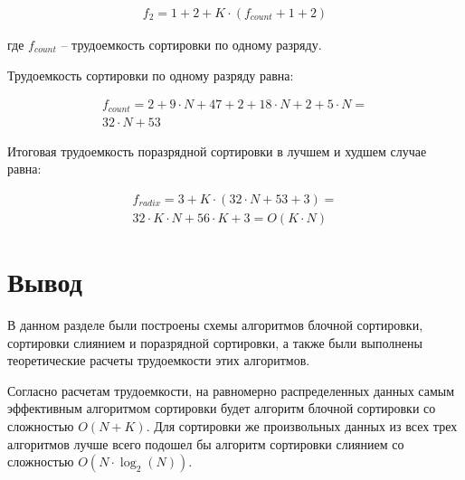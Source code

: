 \begin{equation}
	\label{eq:radixPart2}
	\begin{gathered}
		f_2 = 1 + 2 + K \cdot (f_{count} + 1 + 2)
	\end{gathered}
\end{equation}


где $f_{count}$ -- трудоемкость сортировки по одному разряду.

Трудоемкость сортировки по одному разряду равна:

\begin{equation}
	\label{eq:radixPart3}
	\begin{gathered}
		f_{count} = 2 + 9 \cdot N + 47 + 2 + 18 \cdot N + 2 + 5 \cdot N = \\
		32 \cdot N + 53
	\end{gathered}
\end{equation}

Итоговая трудоемкость поразрядной сортировки в лучшем и худшем случае равна:

\begin{equation}
	\label{eq:radixPart4}
	\begin{gathered}
		f_{radix} = 3 + K \cdot (32 \cdot N + 53 + 3) = \\
		32 \cdot K \cdot N + 56 \cdot K + 3 = O(K \cdot N)
	\end{gathered}
\end{equation}

\section*{Вывод}

В данном разделе были построены схемы алгоритмов блочной сортировки, сортировки слиянием и поразрядной сортировки, а также были выполнены теоретические расчеты трудоемкости этих алгоритмов.

Согласно расчетам трудоемкости, на равномерно распределенных данных самым эффективным алгоритмом сортировки будет алгоритм блочной сортировки со сложностью $O(N + K)$. Для сортировки же произвольных данных из всех трех алгоритмов лучше всего подошел бы алгоритм сортировки слиянием со сложностью $O(N \cdot \log_2(N))$.  


